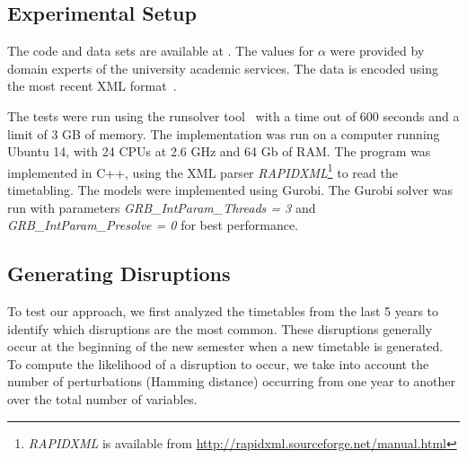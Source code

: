 \documentclass[runningheads]{llncs}
\begin{document}
\subsection{Experimental Setup}
The code and data sets are available at .
The values for $\alpha$ were provided by domain experts of the university academic services. The data is encoded using the most recent XML format~\cite{itc-2019}. %



The tests were run using the runsolver tool~\cite{runsolver} with a time out of 600 seconds and a limit of 3 GB of memory. The implementation was run on a computer running Ubuntu 14, with 24 CPUs at 2.6 GHz and 64 Gb of RAM. The program was implemented in C++, using the XML parser \textit{RAPIDXML}\footnote{\textit{RAPIDXML} is available from \url{http://rapidxml.sourceforge.net/manual.html}} to read the timetabling. The models were implemented using Gurobi\cite{gurobi}. The Gurobi solver was run with parameters \textit{GRB\_IntParam\_Threads = 3} and \textit{GRB\_IntParam\_Presolve = 0} for best performance.


\subsection{Generating Disruptions}

To test our approach, we first analyzed the timetables from the last 5 years to identify which disruptions are the most common. These disruptions generally occur at the beginning of the new semester when a new timetable is generated. To compute the likelihood of a disruption to occur, we take into account the number of perturbations (Hamming distance) occurring from one year to another over the total number of variables.  
\end{document}
